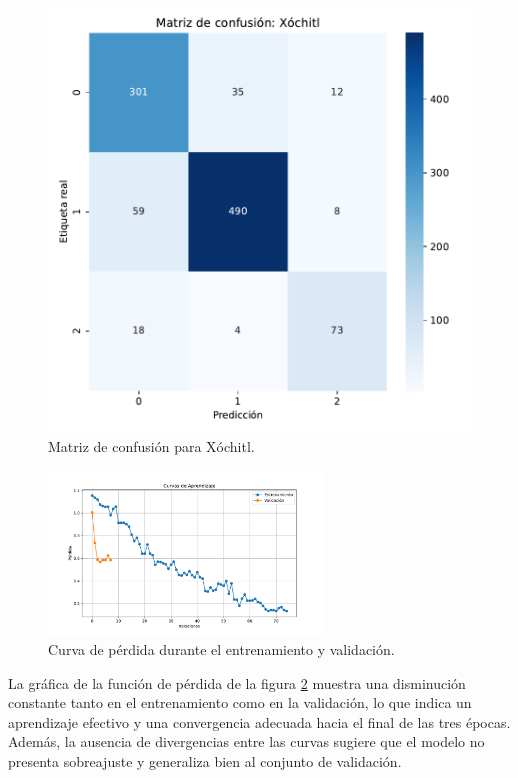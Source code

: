 \documentclass[10pt, a4paper]{article}
\begin{document}
	\begin{figure}[h!]
		\centering
		\begin{minipage}{0.4\textwidth} %
			\includegraphics[width=\linewidth]{conf_matrix_Xóchitl.pdf} 
			\caption{Matriz de confusión para Xóchitl.}
			\label{fig:cmXochitl}
		\end{minipage}
	\end{figure}

	\vspace{-3mm}
	\begin{figure}[H]
		\centering
		\includegraphics[width=0.65\textwidth]{curvas_de_perdida.pdf}
		\caption{Curva de pérdida durante el entrenamiento y validación.}
		\label{fig:curvaTrain}
	\end{figure}
	
	La gráfica de la función de pérdida de la figura \ref{fig:curvaTrain} muestra una disminución constante tanto en el entrenamiento como en la validación, lo que indica un aprendizaje efectivo y una convergencia adecuada hacia el final de las tres épocas. Además, la ausencia de divergencias entre las curvas sugiere que el modelo no presenta sobreajuste y generaliza bien al conjunto de validación.
	
\end{document}

